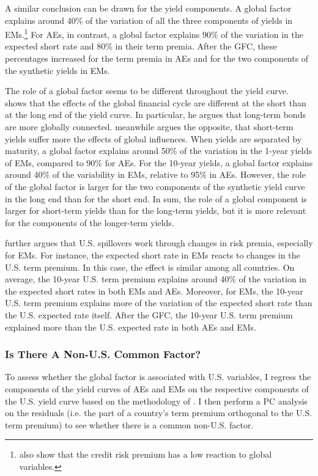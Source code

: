{A similar conclusion can be drawn for the yield components.
A global factor explains around 40\% of the variation of all the three components of yields in EMs.\footnote{ \cite{DuSchreger:2016JoF} also show that the credit risk premium has a low reaction to global variables.} 
For AEs, in contrast, a global factor explains 90\% of the variation in the expected short rate and 80\% in their term premia. 
After the GFC, these percentages increased for the term premia in AEs and for the two components of the synthetic yields in EMs.

The role of a global factor seems to be different throughout the yield curve.
\cite{Obstfeld:2015} shows that the effects of the global financial cycle are different at the short than at the long end of the yield curve. In particular, he argues that long-term bonds are more globally connected.
\cite{Kalemli-Ozcan:2019} meanwhile argues the opposite, that short-term yields suffer more the effects of global influences.
When yields are separated by maturity, a global factor explains around 50\% of the variation in the 1-year yields of EMs, compared to 90\% for AEs. 
For the 10-year yields, a global factor explains around 40\% of the variability in EMs, relative to 95\% in AEs. 
However, the role of the global factor is larger for the two components of the synthetic yield curve in the long end than for the short end.
In sum, the role of a global component is larger for short-term yields than for the long-term yields, but it is more relevant for the components of the longer-term yields.

\cite{Kalemli-Ozcan:2019} further argues that U.S. spillovers work through changes in risk premia, especially for EMs. %
For instance, the expected short rate in EMs reacts to changes in the U.S. term premium. 
In this case, the effect is similar among all countries.
On average, the 10-year U.S. term premium explains around 40\% of the variation in the expected short rates in both EMs and AEs.
Moreover, for EMs, the 10-year U.S. term premium explains more of the variation of the expected short rate than the U.S. expected rate itself. %
After the GFC, the 10-year U.S. term premium explained more than the U.S. expected rate in both AEs and EMs.

\subsubsection{Is There A Non-U.S. Common Factor?}
To assess whether the global factor is associated with U.S. variables, I regress the components of the yield curves of AEs and EMs on the respective components of the U.S. yield curve based on the methodology of \cite{KimWright:2005}.
I then perform a PC analysis on the residuals (i.e. the part of a country's term premium orthogonal to the U.S. term premium) to see whether there is a common non-U.S. factor.

}
